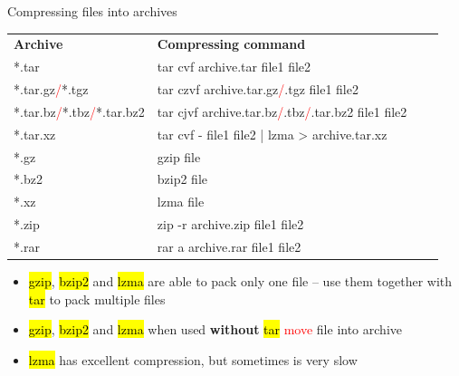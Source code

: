 \documentclass[compress, ucs, xelatex, 11pt, xcolor=svgnames,
  hyperref={
    bookmarks=true,
    unicode=true,
    colorlinks=true,
    pdftitle={Linux, command line and MetaCentrum},
    plainpages=false,
    pdfauthor={Vojtech Zeisek},
    pdfsubject={Course about use of Linux command line, writing shell scripts and using MetaCentrum of CESNET},
    pdfcreator={XeLaTeX},
    pdfkeywords={Linux, GNU, BASH, shell, command line, MetaCentrum},
    linkcolor=DarkRed,
    anchorcolor=DarkBlue,
    citecolor=Indigo,
    filecolor=NavyBlue,
    menucolor=DarkMagenta,
    urlcolor=DarkBlue,
    pdftex},
  url={hyphens, lowtilde} %
  ]{beamer}
\renewcommand{\texttt}[1]{\hl{\ttfamily #1}}
\renewcommand{\alert}[1]{\textcolor{red}{#1}}
\begin{document}
\begin{frame}{Compressing files into archives}
\begin{center}
\begin{tabular}{llll}
\textbf{Archive} & \textbf{Compressing command}\\
*.tar & tar cvf archive.tar file1 file2\\
*.tar.gz\alert{/}*.tgz & tar czvf archive.tar.gz\alert{/}.tgz file1 file2\\
*.tar.bz\alert{/}*.tbz\alert{/}*.tar.bz2 & tar cjvf archive.tar.bz\alert{/}.tbz\alert{/}.tar.bz2 file1 file2\\
*.tar.xz & tar cvf - file1 file2 | lzma > archive.tar.xz\\
*.gz & gzip file\\
*.bz2 & bzip2 file\\
*.xz & lzma file\\
*.zip & zip -r archive.zip file1 file2\\
*.rar & rar a archive.rar file1 file2\\
\end{tabular}
\end{center}
\begin{itemize}
  \item \texttt{gzip}, \texttt{bzip2} and \texttt{lzma} are able to pack only one file -- use them together with \texttt{tar} to pack multiple files
  \item \texttt{gzip}, \texttt{bzip2} and \texttt{lzma} when used \textbf{without} \texttt{tar} \alert{move} file into archive
  \item \texttt{lzma} has excellent compression, but sometimes is very slow
\end{itemize}
\end{frame}
\end{document}
